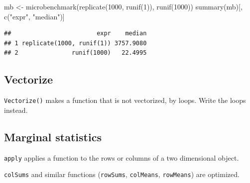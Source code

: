 \documentclass[
  12pt,
  american,
  a4paper,
  extrafontsizes,onecolumn,openright
  ]{memoir}
\newenvironment{Shaded}{\begin{snugshade}}{\end{snugshade}}
\newcommand{\DecValTok}[1]{\textcolor[rgb]{0.00,0.00,0.81}{#1}}
\newcommand{\FunctionTok}[1]{\textcolor[rgb]{0.00,0.00,0.00}{#1}}
\newcommand{\NormalTok}[1]{#1}
\newcommand{\OtherTok}[1]{\textcolor[rgb]{0.56,0.35,0.01}{#1}}
\newcommand{\StringTok}[1]{\textcolor[rgb]{0.31,0.60,0.02}{#1}}
\begin{document}
\scriptsize

\begin{Shaded}
\begin{Highlighting}[]
\NormalTok{mb }\OtherTok{\textless{}{-}} \FunctionTok{microbenchmark}\NormalTok{(}\FunctionTok{replicate}\NormalTok{(}\DecValTok{1000}\NormalTok{, }\FunctionTok{runif}\NormalTok{(}\DecValTok{1}\NormalTok{)), }\FunctionTok{runif}\NormalTok{(}\DecValTok{1000}\NormalTok{))}
\FunctionTok{summary}\NormalTok{(mb)[, }\FunctionTok{c}\NormalTok{(}\StringTok{"expr"}\NormalTok{, }\StringTok{"median"}\NormalTok{)]}
\end{Highlighting}
\end{Shaded}

\begin{verbatim}
##                        expr    median
## 1 replicate(1000, runif(1)) 3757.9080
## 2               runif(1000)   22.4995
\end{verbatim}

\normalsize

\hypertarget{vectorize}{%
\subsection{Vectorize}\label{vectorize}}

\texttt{Vectorize()} makes a function that is not vectorized, by loops.
Write the loops instead.

\hypertarget{marginal-statistics}{%
\subsection{Marginal statistics}\label{marginal-statistics}}

\texttt{apply} applies a function to the rows or columns of a two dimensional object.

\texttt{colSums} and similar functions (\texttt{rowSums}, \texttt{colMeans}, \texttt{rowMeans}) are optimized.

\scriptsize
\end{document}
